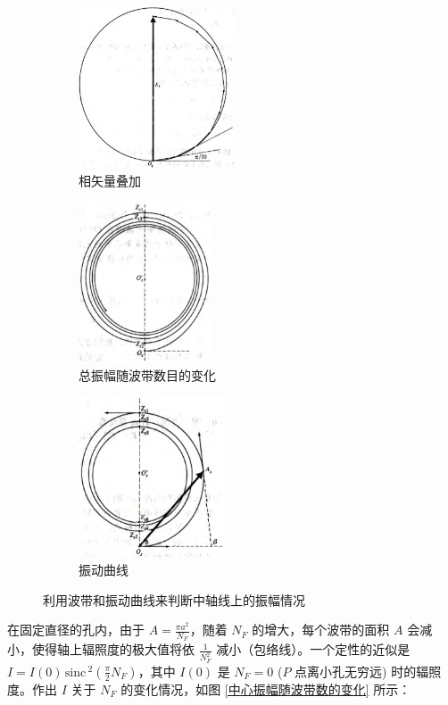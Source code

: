 \documentclass[UTF8]{report}
\def\sinc{\mathrm{\,sinc}\,}
\theoremstyle{MyLineTheoremStyle} %
\theoremstyle{MyBlockTheoremStyle} %
\theoremstyle{MySubsubsectionStyle} %
\begin{document}
\begin{figure}[H]\centering
\begin{subfigure}[b]{0.33\columnwidth}\centering
    \includegraphics[height=135pt]{assets/4/4.5 相矢量叠加.png}
    \caption{相矢量叠加}
\end{subfigure}
\begin{subfigure}[b]{0.33\columnwidth}\centering
    \includegraphics[height=135pt]{assets/4/4.5 总振幅随波带数目的变化.png}
    \caption{总振幅随波带数目的变化}
\end{subfigure}
\begin{subfigure}[b]{0.33\columnwidth}\centering
    \includegraphics[height=135pt]{assets/4/4.5 振动曲线.png}
    \caption{振动曲线}
\end{subfigure}
\caption{利用波带和振动曲线来判断中轴线上的振幅情况}
\label{振动曲线}
\end{figure}

在固定直径的孔内，由于 $A = \frac{\pi a^2}{N_F}$，随着 $N_F$ 的增大，每个波带的面积 $A$ 会减小，使得轴上辐照度的极大值将依 $\frac{1}{N_F^2}$ 减小（包络线）。一个定性的近似是 $I = I(0) \sinc^2 \left(\frac{\pi}{2}N_F\right)$，其中 $I(0)$ 是 $N_F = 0$ ($P$ 点离小孔无穷远) 时的辐照度。作出 $I$ 关于 $N_F$ 的变化情况，如图 \ref{中心振幅随波带数的变化} 所示：
\end{document}
